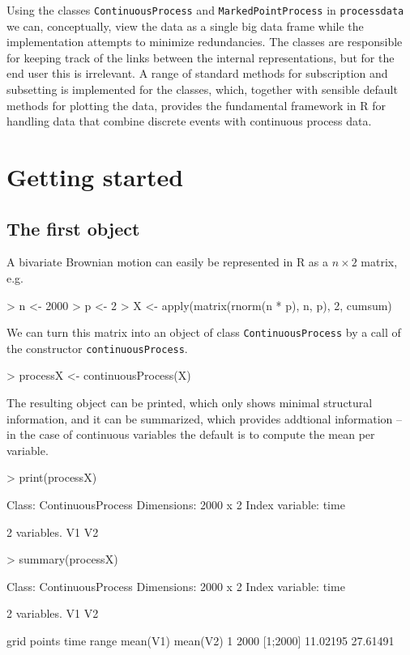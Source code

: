 \documentclass[11pt,a4paper,twoside]{article}
\begin{document}
Using the classes \verb+ContinuousProcess+ and \verb+MarkedPointProcess+ 
in \verb+processdata+ we can, conceptually, view the 
data as a single big data frame while the implementation attempts to minimize  
redundancies. The classes are responsible for keeping track of the
links between the internal representations, but for the end user this
is irrelevant. A range of standard methods for subscription and subsetting
is implemented for the classes, which, together with
sensible default methods for plotting the data, provides the fundamental 
framework in R for handling data that combine discrete events with
continuous process data.

\section{Getting started} 

\subsection{The first object}

A bivariate Brownian motion can easily be represented in R as a $n
\times 2$ matrix, e.g.

\begin{Schunk}
\begin{Sinput}
> n <- 2000
> p <- 2
> X <- apply(matrix(rnorm(n * p), n, p), 2, cumsum)
\end{Sinput}
\end{Schunk}

We can turn this matrix into an object of class
\verb+ContinuousProcess+ by a call of the constructor
\verb+continuousProcess+. 

\begin{Schunk}
\begin{Sinput}
> processX <- continuousProcess(X)
\end{Sinput}
\end{Schunk}

The resulting object can be printed, which only shows minimal
structural information, and it can be summarized, which provides
addtional information -- in the case of continuous variables the
default is to compute the mean per variable.  

\begin{Schunk}
\begin{Sinput}
> print(processX)
\end{Sinput}
\begin{Soutput}
Class: ContinuousProcess 
Dimensions: 2000 x 2 
Index variable: time 

2 variables.
   V1 V2
\end{Soutput}
\begin{Sinput}
> summary(processX)
\end{Sinput}
\begin{Soutput}
Class: ContinuousProcess 
Dimensions: 2000 x 2 
Index variable: time 

2 variables.
   V1 V2

  grid points time range mean(V1) mean(V2)
1        2000   [1;2000] 11.02195 27.61491
\end{Soutput}
\end{Schunk}
\end{document}
